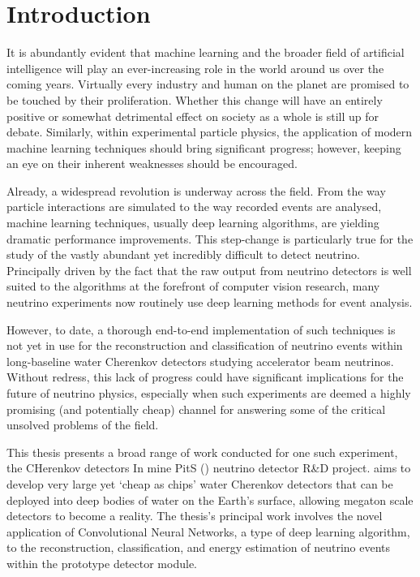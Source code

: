 \chapter{Introduction} %
\label{chap:introduction} %
\setcounter{page}{16}  %

It is abundantly evident that machine learning and the broader field of artificial intelligence
will play an ever-increasing role in the world around us over the coming years. Virtually every
industry and human on the planet are promised to be touched by their proliferation. Whether this
change will have an entirely positive or somewhat detrimental effect on society as a whole is
still up for debate. Similarly, within experimental particle physics, the application of modern
machine learning techniques should bring significant progress; however, keeping an eye on their
inherent weaknesses should be encouraged.

Already, a widespread revolution is underway across the field. From the way particle interactions
are simulated to the way recorded events are analysed, machine learning techniques, usually deep
learning algorithms, are yielding dramatic performance improvements. This step-change is
particularly true for the study of the vastly abundant yet incredibly difficult to detect
neutrino. Principally driven by the fact that the raw output from neutrino detectors is well
suited to the algorithms at the forefront of computer vision research, many neutrino experiments
now routinely use deep learning methods for event analysis.

However, to date, a thorough end-to-end implementation of such techniques is not yet in use for
the reconstruction and classification of neutrino events within long-baseline water Cherenkov
detectors studying accelerator beam neutrinos. Without redress, this lack of progress could have
significant implications for the future of neutrino physics, especially when such experiments are
deemed a highly promising (and potentially cheap) channel for answering some of the critical
unsolved problems of the field.

This thesis presents a broad range of work conducted for one such experiment, the CHerenkov
detectors In mine PitS (\chips) neutrino detector R\&D project. \chips aims to develop very large
yet `cheap as chips' water Cherenkov detectors that can be deployed into deep bodies of water on
the Earth's surface, allowing megaton scale detectors to become a reality. The thesis's principal
work involves the novel application of Convolutional Neural Networks, a type of deep learning
algorithm, to the reconstruction, classification, and energy estimation of neutrino events within
the \chipsfive prototype detector module.

